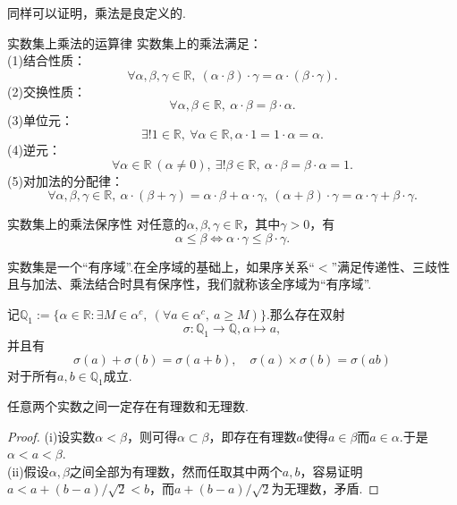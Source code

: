 \documentclass[lang=cn, zihao=5]{elegantbook}
\newcommand{\R}{\mathbb{R}}
\begin{document}
同样可以证明，乘法是良定义的.

\begin{proposition}{实数集上乘法的运算律}
	实数集上的乘法满足： \\
	(1)结合性质：$$\forall \alpha ,\beta ,\gamma \in \R ,~(\alpha \cdot \beta ) \cdot \gamma = \alpha \cdot (\beta \cdot \gamma).$$
	(2)交换性质：$$\forall \alpha ,\beta \in \R,~\alpha \cdot \beta = \beta \cdot \alpha .$$
	(3)单位元：$$\exists ! 1 \in \R ,~\forall \alpha \in \R , \alpha \cdot 1 = 1 \cdot \alpha = \alpha .$$
	(4)逆元：$$\forall \alpha \in \R~(\alpha \neq 0) ,~\exists ! \beta \in \R ,~\alpha \cdot \beta = \beta \cdot \alpha = 1.$$
	(5)对加法的分配律：$$\forall \alpha ,\beta ,\gamma \in \R ,~\alpha \cdot (\beta + \gamma) = \alpha \cdot \beta + \alpha \cdot \gamma ,~ (\alpha + \beta) \cdot \gamma = \alpha \cdot \gamma + \beta \cdot \gamma . $$
\end{proposition}

\begin{proposition}{实数集上的乘法保序性}
	对任意的$\alpha ,\beta ,\gamma \in \R$，其中$\gamma >0$，有$$\alpha \leq \beta \Leftrightarrow \alpha \cdot \gamma \leq \beta \cdot \gamma .$$
\end{proposition}

实数集是一个“有序域”.在全序域的基础上，如果序关系“$<$”满足传递性、三歧性且与加法、乘法结合时具有保序性，我们就称该全序域为“有序域”.

\begin{proposition}
	记$\mathbb{Q}_1:=\{ \alpha \in \R : \exists M \in \alpha ^c,~(\forall a \in \alpha ^c,~a \geq M) \}$.那么存在双射$$\sigma :\mathbb{Q}_1 \to \mathbb{Q},\alpha \mapsto a,$$
	并且有$$\sigma (a) + \sigma (b) = \sigma (a + b),\quad \sigma (a) \times \sigma (b) = \sigma (a  b)$$
	对于所有$a ,b \in \mathbb{Q}_1$成立.
\end{proposition}

\begin{corollary}
	任意两个实数之间一定存在有理数和无理数.
\end{corollary}
\begin{proof}
	(i)设实数$\alpha < \beta$，则可得$\alpha \subset \beta$，即存在有理数$a$使得$a \in \beta$而$a \in \alpha$.于是$\alpha < a < \beta$. \\
	(ii)假设$\alpha ,\beta$之间全部为有理数，然而任取其中两个$a,b$，容易证明$a<a+(b-a)/\sqrt{2}<b$，而$a+(b-a)/\sqrt{2}$为无理数，矛盾.
\end{proof}
\end{document}
